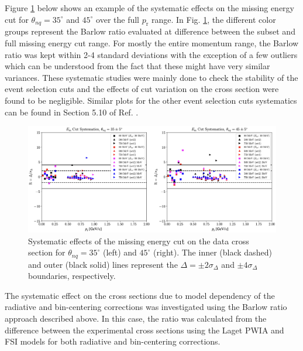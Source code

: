 \documentclass[aps, prl]{revtex4-2}  %
\begin{document}
\indent Figure \ref{fig:fig11} below shows an example of the systematic effects on the missing energy cut for $\theta_{nq}=35^{\circ}$ and $45^{\circ}$ over the full $p_{\mathrm{r}}$ range.
In Fig. \ref{fig:fig11}, the different color groups represent the Barlow ratio evaluated at difference between the subset and full missing energy cut range. For mostly the entire momentum range,
the Barlow ratio was kept within 2-4 standard deviations with the exception of a few outliers which can be understood from the fact that these might have very similar variances. These systematic
studies were mainly done to check the stability of the event selection cuts and the effects of cut variation on the cross section were found to be negligible. Similar plots for the other event selection
cuts systematics can be found in Section 5.10 of Ref. \cite{cyero_phdthesis}. 
\clearpage
\begin{figure}[!ht]
\includegraphics[scale=0.4]{plots/Em_syst.png}
\caption{Systematic effects of the missing energy cut on the data cross section for $\theta_{nq}=35^{\circ}$ (left) and $45^{\circ}$ (right). The inner (black dashed) and outer (black solid)
  lines represent the $\Delta=\pm2\sigma_{\Delta}$ and $\pm4\sigma_{\Delta}$ boundaries, respectively.}
\label{fig:fig11}
\end{figure}
\indent The systematic effect on the cross sections due to model dependency of the radiative and bin-centering corrections was investigated using the Barlow ratio approach described above.
In this case, the ratio was calculated from the difference between the experimental cross sections using the Laget PWIA and FSI models for both radiative and bin-centering corrections.
\end{document}

